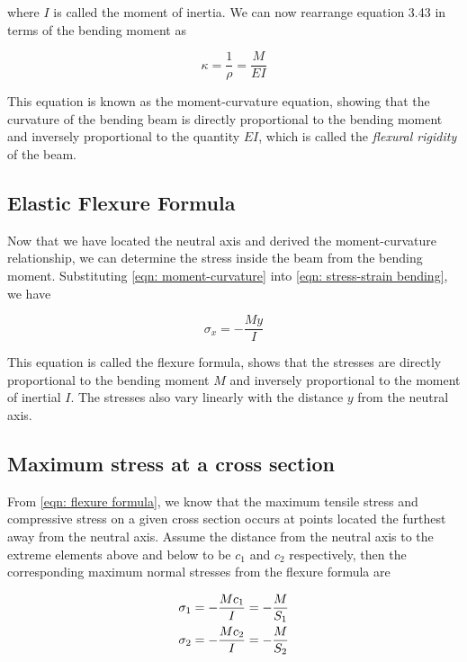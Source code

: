 \documentclass[
10pt,
a4paper,
openany,
svgnames,
]{kaobook} %
\begin{document}
where $I$ is called the moment of inertia. We can now rearrange equation 3.43 in terms of the bending moment as

\begin{equation} \label{eqn: moment-curvature}
  \kappa  = \frac{1}{\rho } = \frac{M}{{EI}}
\end{equation}

This equation is known as the moment-curvature equation, showing that the curvature of the bending beam is directly proportional to the bending moment and inversely proportional to the quantity $EI$, which is called the \emph{flexural rigidity} of the beam.

\subsection{Elastic Flexure Formula}

Now that we have located the neutral axis and derived the moment-curvature relationship, we can determine the stress inside the beam from the bending moment. Substituting \cref{eqn: moment-curvature} into \cref{eqn: stress-strain bending}, we have

\begin{equation} \label{eqn: flexure formula}
  {\sigma _x} =  - \frac{{My}}{I}
\end{equation}

This equation is called the flexure formula, shows that the stresses are directly proportional to the bending moment $M$ and inversely proportional to the moment of inertial $I$. The stresses also vary linearly with the distance $y$ from the neutral axis.

\subsection{Maximum stress at a cross section}

From \cref{eqn: flexure formula}, we know that the maximum tensile stress and compressive stress on a given cross section occurs at points located the furthest away from the neutral axis. Assume the distance from the neutral axis to the extreme elements above and below to be $c_1$ and $c_2$ respectively, then the corresponding maximum normal stresses from the flexure formula are

\begin{equation} \label{eqn: section modulus}
  \begin{gathered}
    \sigma _1 =  - \frac{Mc_1}{I} =  - \frac{M}{S_1} \hfill \\
    \sigma _2 =  - \frac{Mc_2}{I} =  - \frac{M}{S_2} \hfill \\ 
  \end{gathered}
\end{equation}
\end{document}
